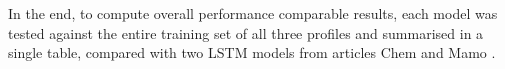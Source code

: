 {In the end, to compute overall performance comparable results, each model was tested against the entire training set of all three profiles and summarised in a single table, compared with two LSTM models from articles Chem and Mamo \cite{mamo_long_2020}.}
